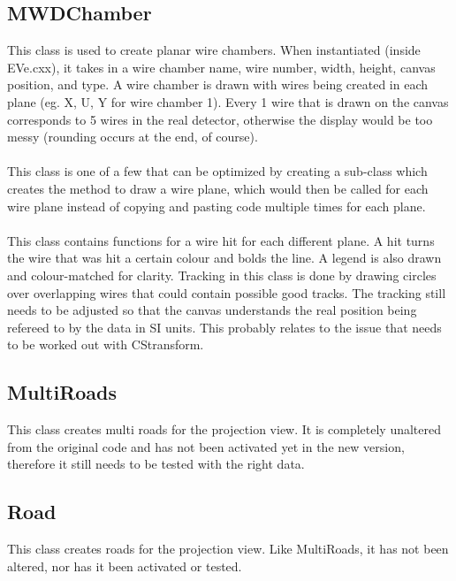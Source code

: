 \documentclass[12pt]{article}
\numberwithin{equation}{section}
\begin{document}
\subsection{MWDChamber}
This class is used to create planar wire chambers. When instantiated (inside EVe.cxx), it takes in a wire chamber name, wire number, width, height, canvas position, and type. A wire chamber is drawn with wires being created in each plane (eg. X, U, Y for wire chamber 1). Every 1 wire that is drawn on the canvas corresponds to 5 wires in the real detector, otherwise the display would be too messy (rounding occurs at the end, of course).
\\
\\
This class is one of a few that can be optimized by creating a sub-class which creates the method to draw a wire plane, which would then be called for each wire plane instead of copying and pasting code multiple times for each plane. 
\\
\\
This class contains functions for a wire hit for each different plane. A hit turns the wire that was hit a certain colour and bolds the line. A legend is also drawn and colour-matched for clarity. Tracking in this class is done by drawing circles over overlapping wires that could contain possible good tracks. The tracking still needs to be adjusted so that the canvas understands the real position being refereed to by the data in SI units. This probably relates to the issue that needs to be worked out with CStransform.

\subsection{MultiRoads}
This class creates multi roads for the projection view. It is completely unaltered from the original code and has not been activated yet in the new version, therefore it still needs to be tested with the right data.

\subsection{Road}
This class creates roads for the projection view. Like MultiRoads, it has not been altered, nor has it been activated or tested.
\end{document}

